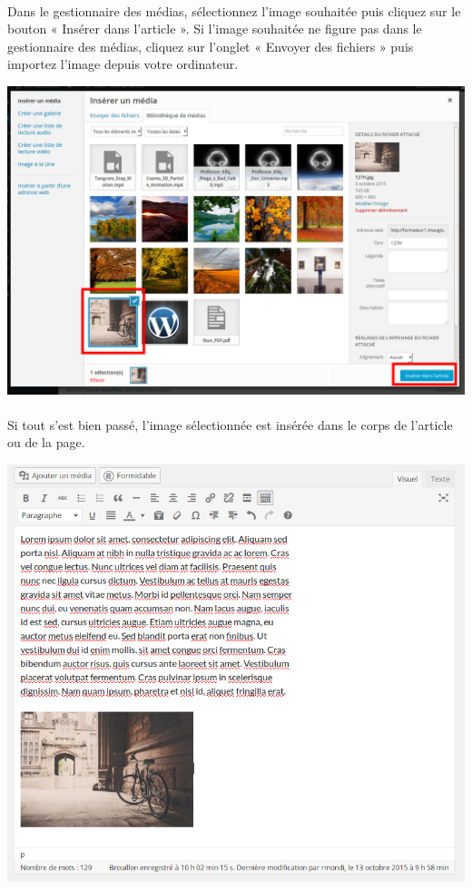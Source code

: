 \documentclass[10pt,a4paper]{article}
\begin{document}
\paragraph{}Dans le gestionnaire des médias, sélectionnez l'image souhaitée puis cliquez sur le bouton « Insérer dans l'article ». Si l'image souhaitée ne figure pas dans le gestionnaire des médias, cliquez sur l'onglet « Envoyer des fichiers » puis importez l'image depuis votre ordinateur.
\begin{center}
\includegraphics[scale=0.25]{img/0103.png}
\end{center}
\paragraph{}Si tout s'est bien passé, l'image sélectionnée est insérée dans le corps de l'article ou de la page.
\begin{center}
\includegraphics[scale=0.3]{img/0104.png}
\end{center}
\end{document}
